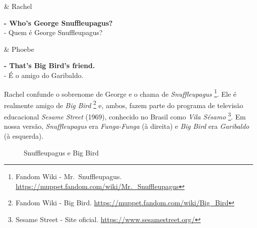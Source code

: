 \begin{tcolorbox}[enhanced,center upper,
    drop fuzzy shadow southeast, boxrule=0.3pt,
    lower separated=false,
    colframe=black!30!dialogoBorder,colback=white]
\begin{minipage}[c]{0.16\linewidth}
   & \centering \scriptsize{Rachel}
\end{minipage}
\hfill
\begin{minipage}[c]{0.8\linewidth}
  \textbf{- Who's George Snuffleupagus?}\\
  - Quem é George Snuffleupagus?
\end{minipage}

\medskip
\begin{minipage}[c]{0.16\linewidth}
   & \centering \scriptsize{Phoebe}
\end{minipage}
\hfill
\begin{minipage}[c]{0.8\linewidth}
  \textbf{- That's Big Bird's friend.}\\
  - É o amigo do Garibaldo.
\end{minipage}
\end{tcolorbox}

Rachel confunde o sobrenome de George e o chama de \emph{Snuffleupagus}
\footnote{\sloppy Fandom Wiki - Mr. Snuffleupagus. \url{https://muppet.fandom.com/wiki/Mr._Snuffleupagus}}.
Ele é realmente amigo de \emph{Big Bird} \footnote{\sloppy Fandom Wiki - Big Bird. \url{https://muppet.fandom.com/wiki/Big_Bird}}
e, ambos, fazem parte do programa de televisão educacional \emph{Sesame
Street} (1969), conhecido no Brasil como \emph{Vila Sésamo} \footnote{\sloppy Sesame Street - Site oficial. \url{https://www.sesamestreet.org/}}.
Em nossa versão, \emph{Snuffleupagus} era \emph{Funga-Funga} (à direita)
e \emph{Big Bird} era \emph{Garibaldo} (à esquerda).

\begin{figure}
  \centering
    \caption{Snuffleupagus e Big Bird\label{fig:snuffleupagus-e-big-bird}}
\end{figure}

